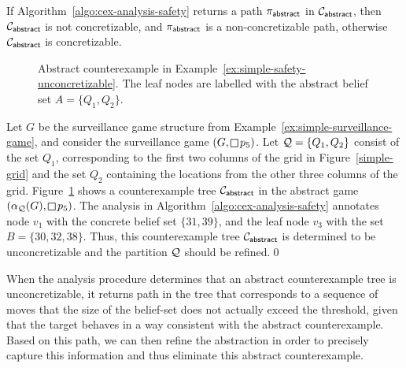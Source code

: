 \begin{theorem}
If Algorithm~\ref{algo:cex-analysis-safety} returns a path $\pi_{\mathsf{abstract}}$ in $\mathcal{C}_{\mathsf{abstract}}$, then $\mathcal{C}_{\mathsf{abstract}}$ is not concretizable, and $\pi_{\mathsf{abstract}}$ is a non-concretizable path, otherwise  $\mathcal{C}_{\mathsf{abstract}}$ is concretizable.
\end{theorem}

\begin{figure}
\begin{center}

\end{center}
\caption{Abstract counterexample in Example~\ref{ex:simple-safety-unconcretizable}. The leaf nodes are labelled with the abstract belief set $A = \{Q_1,Q_2\}$.}
\label{fig:simple-safety-counterex-1}
\end{figure}

\begin{example}\label{ex:simple-safety-unconcretizable}
Let $G$ be the surveillance game structure from Example~\ref{ex:simple-surveillance-game}, and consider the surveillance game $(G,\LTLglobally p_5)$. 
Let $\mathcal{Q} = \{Q_1,Q_2\}$ consist of the set $Q_1$, corresponding to the first two columns of the grid in Figure~\ref{simple-grid} and the set $Q_2$ containing the locations from the other three columns of the grid. Figure~\ref{fig:simple-safety-counterex-1} shows a counterexample tree $\mathcal{C}_{\mathsf{abstract}}$ in the abstract game $(\alpha_\part(G),\LTLglobally p_5)$. The analysis in Algorithm~\ref{algo:cex-analysis-safety} annotates node $v_1$ with the concrete belief set $\{31,39\}$, and the leaf node $v_3$ with the set $B = \{30,32,38\}$. Thus, this counterexample tree $\mathcal{C}_{\mathsf{abstract}}$ is determined to be unconcretizable and the partition $\mathcal{Q}$ should be refined.\qed
\end{example}

When the analysis procedure determines that an abstract counterexample tree is unconcretizable, it returns path in the tree that corresponds to a sequence of moves that the size of the belief-set does not actually exceed the threshold, given that the target behaves in a way consistent with the abstract counterexample.  Based on this path, we can then refine the abstraction in order to precisely capture this information and thus eliminate this abstract counterexample.


